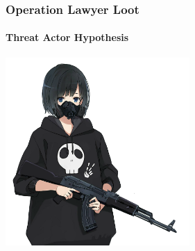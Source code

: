 \documentclass[aspectratio=169]{beamer}
\begin{document}
{
\begin{frame}
  \frametitle{Operation Lawyer Loot}
  \framesubtitle{Threat Actor Hypothesis}
  \begin{center}
    \includegraphics[width=7cm]{anime-threat-actor}
  \end{center}
\end{frame}
}
\end{document}
